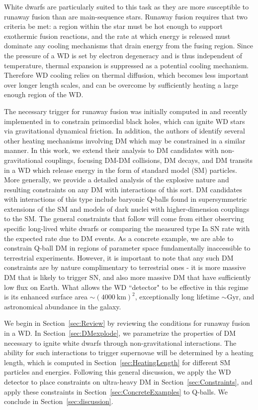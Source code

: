 \documentclass[twocolumn,showpacs,preprintnumbers,amsmath,amssymb,prd]{revtex4}
\begin{document}
White dwarfs are particularly suited to this task as they are more susceptible to runaway fusion than are main-sequence stars.
Runaway fusion requires that two criteria be met: a region within the star must be hot enough to support exothermic fusion reactions, and the rate at which energy is released must dominate any cooling mechanisms that drain energy from the fusing region.
Since the pressure of a WD is set by electron degeneracy and is thus independent of temperature, thermal expansion is suppressed as a potential cooling mechanism.
Therefore WD cooling relies on thermal diffusion, which becomes less important over longer length scales, and can be overcome by sufficiently heating a large enough region of the WD.

The necessary trigger for runaway fusion was initially computed in \cite{Woosley} and recently implemented in \cite{Graham:2015apa} to constrain primordial black holes, which can ignite WD stars via gravitational dynamical friction.
In addition, the authors of \cite{Graham:2015apa} identify several other heating mechanisms involving DM which may be constrained in a similar manner.
In this work, we extend their analysis to DM candidates with non-gravitational couplings, focusing DM-DM collisions, DM decays, and DM transits in a WD which release energy in the form of standard model (SM) particles.
More generally, we provide a detailed analysis of the explosive nature and resulting constraints on any DM with interactions of this sort.
DM candidates with interactions of this type include baryonic Q-balls found in supersymmetric extensions of the SM and models of dark nuclei with higher-dimension couplings to the SM.
The general constraints that follow will come from either observing specific long-lived white dwarfs or comparing the measured type Ia SN rate with the expected rate due to DM events.
As a concrete example, we are able to constrain Q-ball DM in regions of parameter space fundamentally inaccessible to terrestrial experiments.
However, it is important to note that any such DM constraints are by nature complimentary to terrestrial ones - it is more massive DM that is likely to trigger SN, and also more massive DM that have sufficiently low flux on Earth.
What allows the WD ``detector" to be effective in this regime is its enhanced surface area $\sim (4000 ~\text{km})^2$, exceptionally long lifetime $\sim \text{Gyr}$, and astronomical abundance in the galaxy. 

We begin in Section~\ref{sec:Review} by reviewing the conditions for runaway fusion in a WD.
In Section~\ref{sec:DMexplode}, we parametrize the properties of DM necessary to ignite white dwarfs through non-gravitational interactions. 
The ability for such interactions to trigger supernovae will be determined by a heating length, which is computed in Section~\ref{sec:HeatingLength} for different SM particles and energies. 
Following this general discussion, we apply the WD detector to place constraints on ultra-heavy DM in Section~\ref{sec:Constraints}, and apply these constraints in Section~\ref{sec:ConcreteExamples} to Q-balls.
We conclude in Section~\ref{sec:discussion}.
\end{document}
